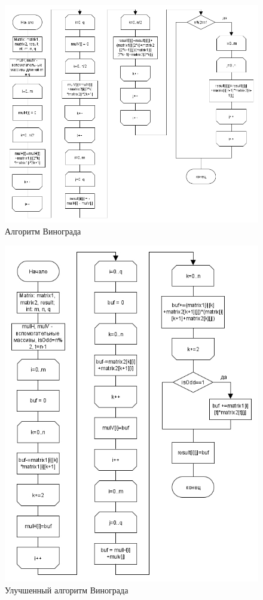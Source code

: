 \begin{figure}[H]
	\centering
	\includegraphics[width=1.05\linewidth]{src/winograd}
	\caption{Алгоритм Винограда}
	\label{fig:winograd}
\end{figure}
\begin{figure}[H]
	\centering
	\includegraphics[width=1.05\linewidth]{src/winogradOptimized}
	\caption{Улучшенный алгоритм Винограда}
	\label{fig:optimizedWinograd}
\end{figure}
